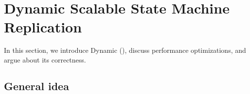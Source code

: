 \section{Dynamic Scalable State Machine Replication}
\label{sec:dssmr}

In this section, we introduce Dynamic \ssmr{} (\dssmr), discuss performance optimizations, and argue about its correctness.

\subsection{General idea}
\label{sec:generalidea}

%



